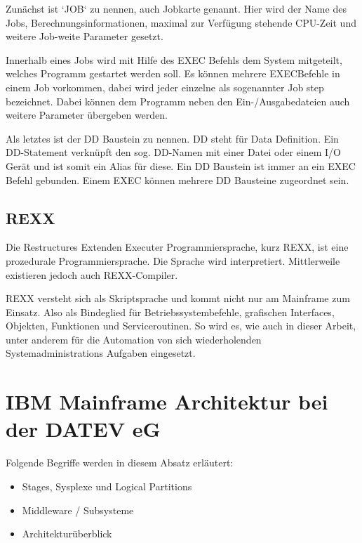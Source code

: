 Zunächst ist `JOB` zu nennen, auch Jobkarte genannt.
Hier wird der Name des Jobs, Berechnungsinformationen, maximal zur Verfügung stehende CPU-Zeit und weitere Job-weite Parameter gesetzt.

Innerhalb eines Jobs wird mit Hilfe des \glqq EXEC\grqq{} Befehls dem System mitgeteilt, welches Programm gestartet werden soll.
Es können mehrere \glqq EXEC\dq  Befehle in einem Job vorkommen, dabei wird jeder einzelne als sogenannter \glqq Job step\grqq{} bezeichnet.
Dabei können dem Programm neben den Ein-/Ausgabedateien auch weitere Parameter übergeben werden.

Als letztes ist der \glqq DD\grqq{} Baustein zu nennen.
\glqq DD\grqq{} steht für Data Definition.
Ein DD-Statement verknüpft den sog. DD-Namen mit einer Datei oder einem I/O Gerät und ist somit ein Alias für diese.
Ein \glqq DD\grqq{} Baustein ist immer an ein \glqq EXEC\grqq{} Befehl gebunden.
Einem \glqq EXEC\grqq{} können mehrere \glqq DD\grqq{} Bausteine zugeordnet sein. 
\cite{Ebbers.2011}

\subsection{REXX}
Die Restructures Extenden Executer Programmiersprache, kurz REXX, ist eine prozedurale Programmiersprache.
Die Sprache wird interpretiert.
Mittlerweile existieren jedoch auch REXX-Compiler.
\cite{Parziale.2007}

REXX versteht sich als Skriptsprache und kommt nicht nur am Mainframe zum Einsatz.
Also als Bindeglied für Betriebssystembefehle, grafischen Interfaces, Objekten, Funktionen und Serviceroutinen.
So wird es, wie auch in dieser Arbeit, unter anderem für die Automation von sich wiederholenden Systemadministrations Aufgaben eingesetzt.
\cite{Fosdick.2005}

\section{IBM Mainframe Architektur bei der DATEV eG}
Folgende Begriffe werden in diesem Absatz erläutert:

\begin{samepage}
\begin{itemize}
\item Stages, Sysplexe und Logical Partitions
\item Middleware / Subsysteme
\item Architekturüberblick
\end{itemize}
\end{samepage}

